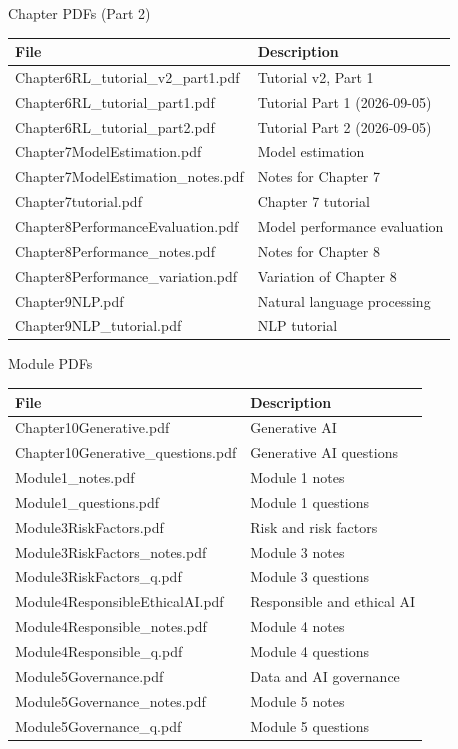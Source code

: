 \documentclass[aspectratio=169,11pt]{beamer}
\begin{document}
	\begin{frame}{Chapter PDFs (Part 2)}
		\small
		\centering
		\begin{tabular}{@{}p{}p{}@{}}
			\toprule
			File & Description \\
			\midrule
			Chapter6RL\_tutorial\_v2\_part1.pdf & Tutorial v2, Part 1 \\
			Chapter6RL\_tutorial\_part1.pdf & Tutorial Part 1 (2026-09-05) \\
			Chapter6RL\_tutorial\_part2.pdf & Tutorial Part 2 (2026-09-05) \\
			Chapter7ModelEstimation.pdf & Model estimation \\
			Chapter7ModelEstimation\_notes.pdf & Notes for Chapter 7 \\
			Chapter7tutorial.pdf & Chapter 7 tutorial \\
			Chapter8PerformanceEvaluation.pdf & Model performance evaluation \\
			Chapter8Performance\_notes.pdf & Notes for Chapter 8 \\
			Chapter8Performance\_variation.pdf & Variation of Chapter 8 \\
			Chapter9NLP.pdf & Natural language processing \\
			Chapter9NLP\_tutorial.pdf & NLP tutorial \\
			\bottomrule
		\end{tabular}
	\end{frame}
	
	\begin{frame}{Module PDFs}
		\small
		\centering
		\begin{tabular}{@{}p{}p{}@{}}
			\toprule
			File & Description \\
			\midrule
			Chapter10Generative.pdf & Generative AI \\
			Chapter10Generative\_questions.pdf & Generative AI questions \\
			Module1\_notes.pdf & Module 1 notes \\
			Module1\_questions.pdf & Module 1 questions \\
			Module3RiskFactors.pdf & Risk and risk factors \\
			Module3RiskFactors\_notes.pdf & Module 3 notes \\
			Module3RiskFactors\_q.pdf & Module 3 questions \\
			Module4ResponsibleEthicalAI.pdf & Responsible and ethical AI \\
			Module4Responsible\_notes.pdf & Module 4 notes \\
			Module4Responsible\_q.pdf & Module 4 questions \\
			Module5Governance.pdf & Data and AI governance \\
			Module5Governance\_notes.pdf & Module 5 notes \\
			Module5Governance\_q.pdf & Module 5 questions \\
			\bottomrule
		\end{tabular}
	\end{frame}
	
\end{document}
